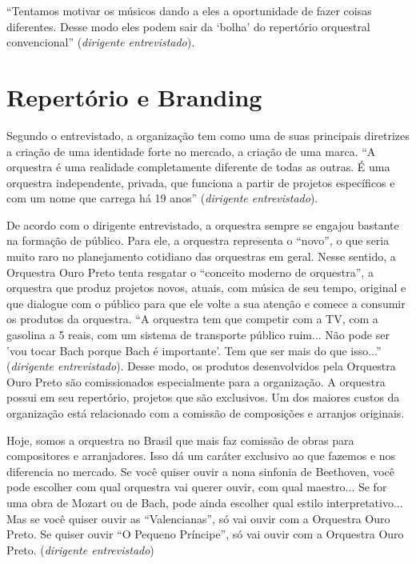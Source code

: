 \documentclass[a4paper, 12pt, openright, oneside, german, french, english, brazil]{abntex2}
\begin{document}
	``Tentamos motivar os músicos dando a eles a oportunidade de fazer coisas diferentes. Desse modo eles podem sair da `bolha' do repertório orquestral convencional'' (\textit{dirigente entrevistado}). 
	
	
	\section{Repertório e Branding}
	
	Segundo o entrevistado, a organização tem como uma de suas principais diretrizes a criação de uma identidade forte no mercado, a criação de uma marca. ``A orquestra é uma realidade completamente diferente de todas as outras. É uma orquestra independente, privada, que funciona a partir de projetos específicos e com um nome que carrega há 19 anos'' (\textit{dirigente entrevistado}).

	De acordo com o dirigente entrevistado, a orquestra sempre se engajou bastante na formação de público. Para ele, a orquestra representa o ``novo'', o que seria muito raro no planejamento cotidiano das orquestras em geral. Nesse sentido, a Orquestra Ouro Preto tenta resgatar o ``conceito moderno de orquestra'', a orquestra que produz projetos novos, atuais, com música de seu tempo, original e que dialogue com o público para que ele volte a sua atenção e comece a consumir os produtos da orquestra. ``A orquestra tem que competir com a TV, com a gasolina a 5 reais, com um sistema de transporte público ruim... Não pode ser 'vou tocar Bach porque Bach é importante'. Tem que ser mais do que isso...'' (\textit{dirigente entrevistado}). Desse modo, os produtos desenvolvidos pela Orquestra Ouro Preto são comissionados especialmente para a organização. A orquestra possui em seu repertório, projetos que são exclusivos. Um dos maiores custos da organização está relacionado com a comissão de composições e arranjos originais. 

	\begin{citacao}
		Hoje, somos a orquestra no Brasil que mais faz comissão de obras para compositores e arranjadores. Isso dá um caráter exclusivo ao que fazemos e nos diferencia no mercado. Se você quiser ouvir a nona sinfonia de Beethoven, você pode escolher com qual orquestra vai querer ouvir, com qual maestro...
		Se for uma obra de Mozart ou de Bach, pode ainda escolher qual estilo interpretativo... Mas se você quiser ouvir as ``Valencianas'', só vai ouvir com a Orquestra Ouro Preto. Se quiser ouvir ``O Pequeno Príncipe'', só vai ouvir com a Orquestra Ouro Preto. (\textit{dirigente entrevistado})
	\end{citacao}
\end{document}
